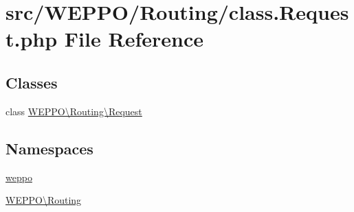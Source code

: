 \hypertarget{class_8Request_8php}{}\section{src/\+W\+E\+P\+P\+O/\+Routing/class.Request.\+php File Reference}
\label{class_8Request_8php}
\subsection*{Classes}
\begin{DoxyCompactItemize}
\item 
class \hyperlink{classWEPPO_1_1Routing_1_1Request}{W\+E\+P\+P\+O\textbackslash{}\+Routing\textbackslash{}\+Request}
\end{DoxyCompactItemize}
\subsection*{Namespaces}
\begin{DoxyCompactItemize}
\item 
 \hyperlink{namespaceweppo}{weppo}
\item 
 \hyperlink{namespaceWEPPO_1_1Routing}{W\+E\+P\+P\+O\textbackslash{}\+Routing}
\end{DoxyCompactItemize}
